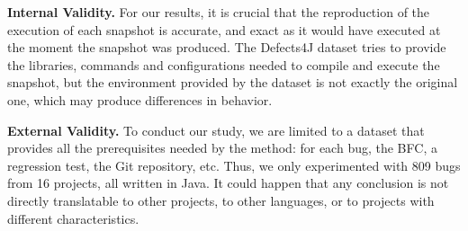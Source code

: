 \textbf{Internal Validity.}
For our results, it is crucial that the reproduction of the execution of each snapshot is accurate, and exact as it would have executed at the moment the snapshot was produced. 
The Defects4J dataset tries to provide the libraries, commands and configurations needed to compile and execute the snapshot, but the environment provided by the dataset is not exactly the original one,  which may produce differences in behavior.

\textbf{External Validity.}
To conduct our study, we are limited to a dataset that provides all the prerequisites needed by the method: for each bug, the BFC, a regression test, the Git repository, etc. Thus, we only experimented with 809 bugs from 16 projects, all written in Java. It could happen that any conclusion is not directly translatable to other projects, to other languages, or to projects with different characteristics.


